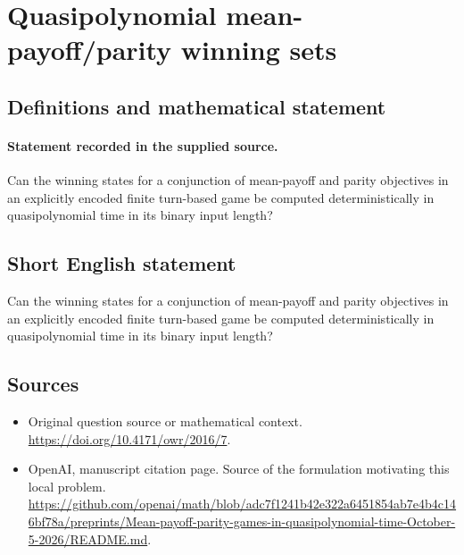 \documentclass[11pt]{article}
\begin{document}
\section*{Quasipolynomial mean-payoff/parity winning sets}\label{statement}
\subsection{Definitions and mathematical statement}
\paragraph{Statement recorded in the supplied source.}
Can the winning states for a conjunction of mean-payoff and parity objectives in an explicitly encoded finite turn-based game be computed deterministically in quasipolynomial time in its binary input length?
\subsection{Short English statement}
Can the winning states for a conjunction of mean-payoff and parity objectives in an explicitly encoded finite turn-based game be computed deterministically in quasipolynomial time in its binary input length?
\subsection{Sources}
\begin{itemize}
\item[S1] Original question source or mathematical context.
\url{https://doi.org/10.4171/owr/2016/7}.
\item[S2] OpenAI, manuscript citation page. Source of the formulation motivating this local problem.
\url{https://github.com/openai/math/blob/adc7f1241b42e322a6451854ab7e4b4c146bf78a/preprints/Mean-payoff-parity-games-in-quasipolynomial-time-October-5-2026/README.md}.
\end{itemize}
\end{document}
